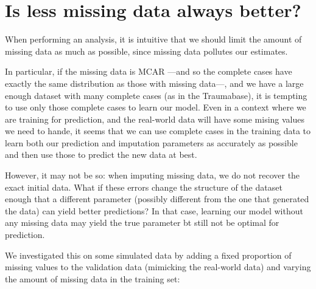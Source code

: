 	\section{Is less missing data always better?}
When performing an analysis, it is intuitive that we should limit the amount of missing data as much as possible, since missing data pollutes our estimates.

In particular, if the missing data is MCAR ---and so the complete cases have exactly the same distribution as those with missing data---, and we have a large enough dataset with many complete cases (as in the Traumabase), it is tempting to use only those complete cases to learn our model. Even in a context where we are training for prediction, and the real-world data will have some mising values we need to hande, it seems that we can use complete cases in the training data to learn both our prediction and imputation parameters as accurately as possible and then use those to predict the new data at best.

However, it may not be so: when imputing missing data, we do not recover the exact initial data. What if these errors change the structure of the dataset enough that a different parameter (possibly different from the one that generated the data) can yield better predictions? In that case, learning our model without any missing data may yield the true parameter bt still not be optimal for prediction.

We investigated this on some simulated data by adding a fixed proportion of missing values to the validation data (mimicking the real-world data) and varying the amount of missing data in the training set:

